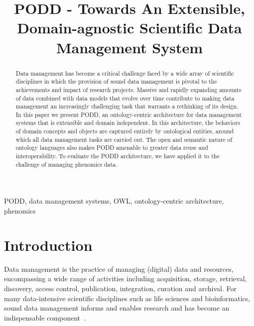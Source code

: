 \documentclass[conference,10pt]{IEEEtran}
\begin{document}
\title{PODD - Towards An Extensible, Domain-agnostic Scientific Data Management System}

\author{
}

\maketitle


\begin{abstract}
Data management has become a critical challenge faced by a wide array of scientific disciplines in which the provision of sound data management is pivotal to the achievements and impact of research projects. Massive and rapidly expanding amounts of data combined with data models that evolve over time contribute to making data management an increasingly challenging task that warrants a rethinking of its design. In this paper we present PODD, an ontology-centric architecture for data management systems that is extensible and domain independent. In this architecture, the behaviors of domain concepts and objects are captured entirely by ontological entities, around which all data management tasks are carried out. The open and semantic nature of ontology languages also makes PODD amenable to greater data reuse and interoperability. To evaluate the PODD architecture, we have applied it to the challenge of managing phenomics data. 
\end{abstract}

\begin{IEEEkeywords}
PODD, data management systems, OWL, ontology-centric architecture, phenomics
\end{IEEEkeywords}

\section{Introduction}\label{sec:intro}
Data management is the practice of managing (digital) data and resources, encompassing a wide range of activities including acquisition, storage, retrieval, discovery, access control, publication, integration, curation and archival. For many data-intensive scientific disciplines such as life sciences and bioinformatics, sound data management informs and enables research and has become an indispensable component~\cite{1107503}.
\end{document}
